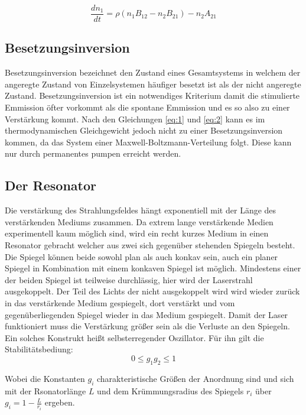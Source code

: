 \begin{equation}
    \label{eq:2}
    \frac{dn_1}{dt}=\rho(n_1B_{12}-n_2B_{21})-n_2A_{21}
\end{equation}


\subsection{Besetzungsinversion}
\label{sec:Besetzungsinversion}
Besetzungsinversion bezeichnet den Zustand eines Gesamtsystems in welchem der angeregte Zustand von 
Einzelsystemen häufiger besetzt ist als der nicht angeregte Zustand. Besetzungsinversion ist ein notwendiges
Kriterium damit die stimulierte Emmission öfter vorkommt als die spontane Emmission und es so also zu einer
Verstärkung kommt. Nach den Gleichungen \autoref{eq:1} und \autoref{eq:2} kann es im thermodynamischen
Gleichgewicht jedoch nicht zu einer Besetzungsinversion kommen, da das System einer Maxwell-Boltzmann-Verteilung 
folgt. Diese kann nur durch permanentes pumpen erreicht werden. 

\subsection{Der Resonator}
\label{sec:Resonator}
Die verstärkung des Strahlungsfeldes hängt exponentiell mit der Länge des verstärkenden Mediums zusammen.
Da extrem lange verstärkende Medien experimentell kaum möglich sind, wird ein recht kurzes Medium in einen 
Resonator gebracht welcher aus zwei sich gegenüber stehenden Spiegeln besteht. Die Spiegel können beide 
sowohl plan als auch konkav sein, auch ein planer Spiegel in Kombination mit einem konkaven Spiegel ist möglich.
Mindestens einer der beiden Spiegel ist teilweise durchlässig, hier wird der Laserstrahl ausgekoppelt.
Der Teil des Lichts der nicht ausgekoppelt wird wird wieder zurück in das verstärkende Medium gespiegelt,
dort verstärkt und vom gegenüberliegenden Spiegel wieder in das Medium gespiegelt. Damit der Laser funktioniert
muss die Verstärkung größer sein als die Verluste an den Spiegeln. Ein solches Konstrukt heißt selbsterregender
Oszillator. Für ihn gilt die Stabilitätsbediung:
\begin{equation}
    0 \leq g_1g_2 \leq 1
\end{equation}

Wobei die Konstanten $g_i$ charakteristische Größen der Anordnung sind und sich mit der Rsonatorlänge $L$ und dem
Krümmungsradius des Spiegels $r_i$ über $g_i=1-\frac{L}{r_i}$ ergeben.



